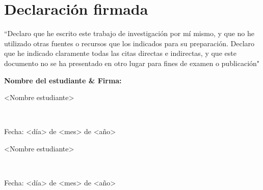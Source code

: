 \newcommand*\wildcard[2][6cm]{\vspace{2cm}\parbox{#1}{\hrulefill\par#2}} 

\section*{Declaración firmada}

\vspace{1cm}

“Declaro que he escrito este trabajo de investigación por mí mismo, y que no he utilizado otras fuentes o recursos que los indicados para su preparación. Declaro que he indicado claramente todas las citas directas e indirectas, y que este documento no se ha presentado en otro lugar para fines de examen o publicación"

\vspace{3cm}
\textbf{Nombre del estudiante \& Firma:}
\vspace{1cm}

\begingroup

    \begin{center}
        \wildcard{\centerline{<Nombre estudiante>} ~\\ \centerline{Fecha: <día> de <mes> de <año>}}
        \hspace{2cm} %
        \wildcard{\centerline{<Nombre estudiante>} ~\\ \centerline{Fecha: <día> de <mes> de <año>} }
    \end{center}

\endgroup


\pagebreak